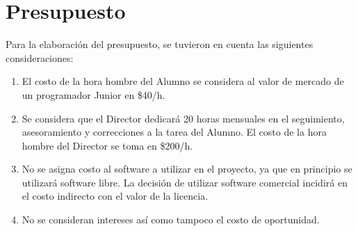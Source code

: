 \documentclass[12pt,bibliography=oldstyle,DIV=12,parskip=half-]{scrreprt}
\begin{document}
\section{Presupuesto}
Para la elaboración del presupuesto, se tuvieron en cuenta las
siguientes consideraciones:
\begin{enumerate}
\item El costo de la hora hombre del Alumno se considera al valor de
  mercado de un programador Junior en \$40/h.
\item Se considera que el Director dedicará 20 horas mensuales en el
  seguimiento, asesoramiento y correcciones a la tarea del Alumno. El
  costo de la hora hombre del Director se toma en \$200/h.
\item No se asigna costo al software a utilizar en el proyecto, ya que
  en principio se utilizará software libre. La decisión de utilizar
  software comercial incidirá en el costo indirecto con el valor de la
  licencia.
\item No se consideran intereses así como tampoco el costo de
  oportunidad.
\end{enumerate}
\end{document}
